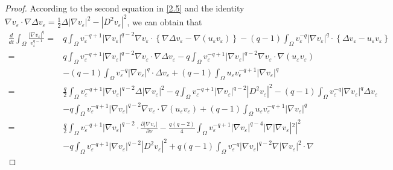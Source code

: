 \documentclass[12pt]{article}
\theoremstyle{plain}
\theoremstyle{definition}
\numberwithin{equation}{section}
\begin{document}
\begin{proof}
According to the second equation in \eqref{2.5} and the identity $\nabla v_{\varepsilon} \cdot \nabla \Delta
v_{\varepsilon}=\frac{1}{2}\Delta|\nabla v_{\varepsilon}|^2-|D^2 v_{\varepsilon}|^2$, we can obtain that
    \begin{align}\label{2.31}
        \frac{d}{dt}\int_{\Omega}\frac{|\nabla v_{\varepsilon}|^q}{v_{\varepsilon}^{q-1}}=&q\int_{\Omega}v_{\varepsilon}^{-q+1}|\nabla
        v_{\varepsilon}|^{q-2}\nabla v_{\varepsilon}\cdot\left\{\nabla \Delta v_{\varepsilon}-\nabla (u_{\varepsilon}
        v_{\varepsilon})\right\}-(q-1)\int_{\Omega}v_{\varepsilon}^{-q}|\nabla v_{\varepsilon}|^q \cdot\left\{\Delta
        v_{\varepsilon}-u_{\varepsilon} v_{\varepsilon}\right\}\nonumber
        \\
        =&q\int_{\Omega}v_{\varepsilon}^{-q+1}|\nabla v_{\varepsilon}|^{q-2}\nabla v_{\varepsilon}\cdot\nabla \Delta
        v_{\varepsilon}-q\int_{\Omega}v_{\varepsilon}^{-q+1}|\nabla v_{\varepsilon}|^{q-2}\nabla v_{\varepsilon}\cdot\nabla (u_{\varepsilon}
        v_{\varepsilon})\nonumber\\
        &-(q-1)\int_{\Omega}v_{\varepsilon}^{-q}|\nabla v_{\varepsilon}|^q \cdot\Delta
        v_{\varepsilon}+(q-1)\int_{\Omega}u_{\varepsilon}v_{\epsilon}^{-q+1}|\nabla v_{\varepsilon}|^{q}\nonumber\\
        =&\frac{q}{2}\int_{\Omega}v_{\varepsilon}^{-q+1}|\nabla v_{\varepsilon}|^{q-2}\Delta |\nabla
        v_{\varepsilon}|^2-q\int_{\Omega}v_{\varepsilon}^{-q+1}|\nabla v_{\varepsilon}|^{q-2}|D^2
        v_{\varepsilon}|^2-(q-1)\int_{\Omega}v_{\varepsilon}^{-q}|\nabla v_{\varepsilon}|^{q} \Delta v_{\varepsilon}\nonumber\\
        &-q\int_{\Omega}v_{\varepsilon}^{-q+1}|\nabla v_{\varepsilon}|^{q-2}\nabla v_{\varepsilon}\cdot\nabla (u_{\varepsilon}
        v_{\varepsilon})+(q-1)\int_{\Omega}u_{\varepsilon}v_{\varepsilon}^{-q+1}|\nabla v_{\varepsilon}|^{q}\nonumber\\
        =&\frac{q}{2}\int_{\Omega}v_{\varepsilon}^{-q+1}|\nabla v_{\varepsilon}|^{q-2}\cdot\frac{\partial|\nabla
        v_{\varepsilon}|}{\partial\nu}-\frac{q(q-2)}{4}\int_{\Omega}v_{\varepsilon}^{-q+1}|\nabla v_{\varepsilon}|^{q-4}|\nabla |\nabla
        v_{\varepsilon}|^2|^2\nonumber\\
        &-q\int_{\Omega}v_{\varepsilon}^{-q+1}|\nabla v_{\varepsilon}|^{q-2}|D^2
        v_{\varepsilon}|^2+q(q-1)\int_{\Omega}v_{\varepsilon}^{-q}|\nabla v_{\varepsilon}|^{q-2}\nabla |\nabla v_{\varepsilon}|^2\cdot\nabla

\end{align}
\end{proof}
\end{document}
